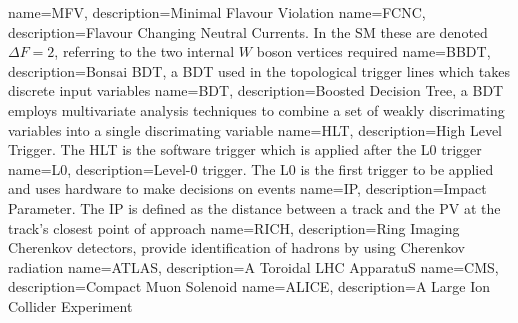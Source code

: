                  {
                   name=MFV,
                   description={Minimal Flavour Violation}
                 }
                 {
                   name=FCNC,
                   description={Flavour Changing Neutral Currents. In the \Gls{SM} these are denoted $\Delta F = 2$, referring to the two internal $W$ boson vertices required}}
                 {
                   name=BBDT,
                   description={Bonsai BDT, a BDT used in the topological trigger lines which takes discrete input variables}}
                 {
                   name=BDT,
                   description={Boosted Decision Tree, a BDT employs multivariate analysis techniques to combine a set of weakly discrimating variables into a single discrimating variable}}                   
                 {
                   name=HLT,
                   description={High Level Trigger. The HLT is the software trigger which is applied after the \Gls{L0} trigger}}
                 {
                   name=L0,
                   description={Level-0 trigger. The L0 is the first trigger to be applied and uses hardware to make decisions on events  }}                   
                 {
                   name=IP,
                   description={Impact Parameter. The IP is defined as the distance between a track and the \Gls{PV} at the track's closest point of approach }}                                                                        
                 {
                   name=RICH,
                   description={Ring Imaging Cherenkov detectors, provide identification of hadrons by using Cherenkov radiation}                         
                 }                 
                 {
                   name=ATLAS,
                   description={A Toroidal LHC ApparatuS}
                 }
                 {
                   name=CMS,
                   description={Compact Muon Solenoid}
                 }
                 {
                   name=ALICE,
                   description={A Large Ion Collider Experiment}
                 }

